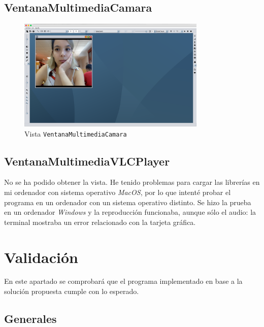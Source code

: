 \subsection{VentanaMultimediaCamara}
 
\vskip0.3cm
\begin{figure}[H]
 \centering
  \includegraphics[width=0.8\textwidth]{video/webcam.jpg}
 \caption{Vista \texttt{VentanaMultimediaCamara}}
 \label{diseño}
 \end{figure}

\subsection{VentanaMultimediaVLCPlayer} 
 No se ha podido obtener la vista. He tenido problemas para cargar las librerías en mi ordenador con sistema operativo \textit{MacOS}, por lo que intenté probar el programa en un ordenador con un sistema operativo distinto. Se hizo la prueba en un ordenador \textit{Windows} y la reproducción funcionaba, aunque sólo el audio: la terminal mostraba un error relacionado con la tarjeta gráfica.
\clearpage
\section{Validación}
En este apartado se comprobará que el programa implementado en base a la solución propuesta cumple con lo esperado.
\subsection{Generales}
